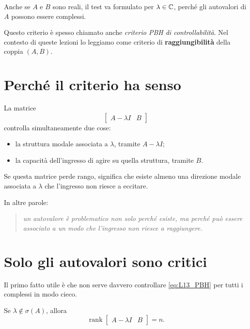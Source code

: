\begin{osservazione}
Anche se \(A\) e \(B\) sono reali, il test va formulato per \(\lambda\in\mathbb{C}\), perché gli autovalori di \(A\) possono essere complessi.
\end{osservazione}

\begin{osservazione}
Questo criterio è spesso chiamato anche \emph{criterio PBH di controllabilità}.  
Nel contesto di queste lezioni lo leggiamo come criterio di \textbf{raggiungibilità} della coppia \((A,B)\).
\end{osservazione}

\section{Perché il criterio ha senso}

La matrice
\[
\begin{bmatrix}
A-\lambda I & B
\end{bmatrix}
\]
controlla simultaneamente due cose:
\begin{itemize}
    \item la struttura modale associata a \(\lambda\), tramite \(A-\lambda I\);
    \item la capacità dell’ingresso di agire su quella struttura, tramite \(B\).
\end{itemize}

Se questa matrice perde rango, significa che esiste almeno una direzione modale associata a \(\lambda\) che l’ingresso non riesce a eccitare.

In altre parole:
\begin{quote}
\emph{un autovalore è problematico non solo perché esiste, ma perché può essere associato a un modo che l’ingresso non riesce a raggiungere.}
\end{quote}

\section{Solo gli autovalori sono critici}

Il primo fatto utile è che non serve davvero controllare \eqref{eq:L13_PBH} per tutti i complessi in modo cieco.

\begin{proposizione}
Se \(\lambda\notin\sigma(A)\), allora
\[
\operatorname{rank}
\begin{bmatrix}
A-\lambda I & B
\end{bmatrix}=n.
\]
\end{proposizione}

